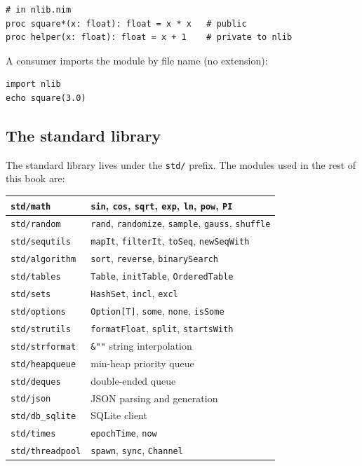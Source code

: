 \documentclass[justified, sixbynine]{tufte-book}
\def\ft{\small\tt}
\theoremstyle{plain}%
\newtheorem * {corollary}{Corollary}
\theoremstyle{definition}
\theoremstyle{remark}
\newtheorem * {remark}{Remark}
\newtheorem * {note}{Note}
\begin{document}
\begin{fullwidth}
\begin{lstlisting}
# in nlib.nim
proc square*(x: float): float = x * x   # public
proc helper(x: float): float = x + 1    # private to nlib
\end{lstlisting}

A consumer imports the module by file name (no extension):

\begin{lstlisting}
import nlib
echo square(3.0)
\end{lstlisting}

\goodbreak\subsection{The standard library}

The standard library lives under the {\ft std/} prefix. The modules used in the rest of this book are:

\begin{tabular}{|l|l|}\hline
{\ft std/math}        & {\ft sin}, {\ft cos}, {\ft sqrt}, {\ft exp}, {\ft ln}, {\ft pow}, {\ft PI} \\ \hline
{\ft std/random}      & {\ft rand}, {\ft randomize}, {\ft sample}, {\ft gauss}, {\ft shuffle} \\ \hline
{\ft std/sequtils}    & {\ft mapIt}, {\ft filterIt}, {\ft toSeq}, {\ft newSeqWith} \\ \hline
{\ft std/algorithm}   & {\ft sort}, {\ft reverse}, {\ft binarySearch} \\ \hline
{\ft std/tables}      & {\ft Table}, {\ft initTable}, {\ft OrderedTable} \\ \hline
{\ft std/sets}        & {\ft HashSet}, {\ft incl}, {\ft excl} \\ \hline
{\ft std/options}     & {\ft Option[T]}, {\ft some}, {\ft none}, {\ft isSome} \\ \hline
{\ft std/strutils}    & {\ft formatFloat}, {\ft split}, {\ft startsWith} \\ \hline
{\ft std/strformat}   & {\ft \&""} string interpolation \\ \hline
{\ft std/heapqueue}   & min-heap priority queue \\ \hline
{\ft std/deques}      & double-ended queue \\ \hline
{\ft std/json}        & JSON parsing and generation \\ \hline
{\ft std/db\_sqlite}  & SQLite client \\ \hline
{\ft std/times}       & {\ft epochTime}, {\ft now} \\ \hline
{\ft std/threadpool}  & {\ft spawn}, {\ft sync}, {\ft Channel} \\ \hline
\end{tabular}


\end{fullwidth}
\end{document}
